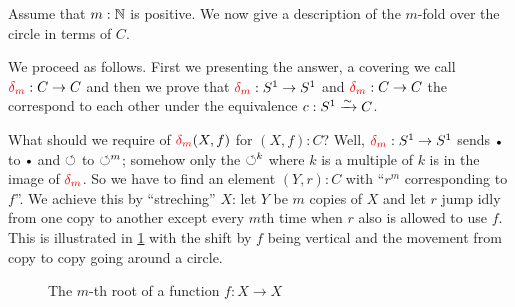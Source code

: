 \begin{example}\label{exa:mfoldCcover}
Assume that $m:\mathbb{N}$ is positive.  We now give a description of 
the $m$-fold \covering over the circle in terms of $C$.

We proceed as follows.  First we presenting the answer, a covering we call $\dg{m}:C\to C$ and then we prove that $\dg{m}:S^1\to S^1$ and $\dg{m}:C\to C$ the  correspond to each other under the equivalence $c:S^1\xrightarrow{\sim} C$. 

 What should we require of $\dg{m}(X,f)$ for $(X,f):C$? Well, $\dg{m}:S^1\to S^1$ sends $\base$ to $\base$ and $\circlearrowleft$ to $\circlearrowleft^m$; somehow only the $\circlearrowleft^k$ where $k$ is a multiple of $k$ is in the image of $\dg{m}$.  So we have to find an element $(Y,r):C$ with ``$r^m$ corresponding to $f$''.  We achieve this by ``streching'' $X$: let $Y$ be $m$ copies of $X$ and let $r$ jump idly from one copy to another except every $m$th time when $r$ also is allowed to use $f$.  
This is illustrated in \cref{fig:root} with the shift by $f$ being 
vertical and the movement from copy to copy going around a circle.  
\begin{figure}[bt]
  \centering
  \caption{The $m$-th root of a function $f: X\to X$}
  \label{fig:root}
\end{figure}


\end{example}
